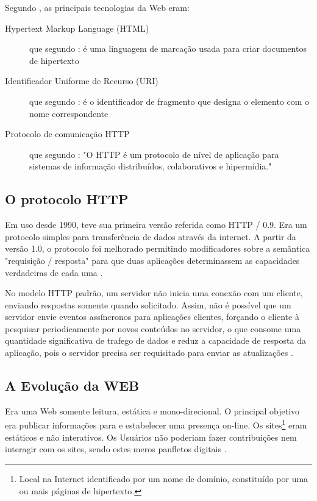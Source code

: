 Segundo , as principais tecnologias da Web eram:
\begin{description}
	\item[Hypertext Markup Language (HTML)] que segundo : é uma linguagem de marcação usada para criar documentos de hipertexto

	\item[Identificador Uniforme de Recurso (URI)]  que segundo : é o identificador de fragmento que designa o elemento com o nome correspondente

	\item[Protocolo de comunicação HTTP] que segundo : "O HTTP é um protocolo de nível de aplicação para sistemas de informação distribuídos, colaborativos e hipermídia."
\end{description}

\subsection{O protocolo HTTP}
Em uso desde 1990, teve sua primeira versão referida como HTTP / 0.9. Era um protocolo simples para transferência de dados através da internet. A partir da versão 1.0, o protocolo foi melhorado permitindo modificadores sobre a semântica "requisição / resposta" para que duas aplicações determinassem as capacidades verdadeiras de cada uma \cite[p.~7]{Fielding1999}.

No modelo HTTP padrão, um servidor não inicia uma conexão com um cliente, enviando respostas somente quando solicitado. Assim, não é possível que um servidor envie eventos assíncronos para aplicações clientes, forçando o cliente à pesquisar periodicamente por novos conteúdos no servidor, o que consome uma quantidade significativa de trafego de dados e reduz a capacidade de resposta da aplicação, pois o servidor precisa ser requisitado para enviar as atualizações \cite{Loreto2011}.

\subsection{A Evolução da WEB}
Era uma Web somente leitura, estática e mono-direcional. O principal objetivo era publicar informações para e estabelecer uma presença on-line. Os sites\footnote{Local na Internet identificado por um nome de domínio, constituído por uma ou mais páginas de hipertexto.} eram estáticos e não interativos. Os Usuários não poderiam fazer contribuições nem interagir com os sites, sendo estes meros panfletos digitais \cite[p.~2-3]{Aghaei2012}.

